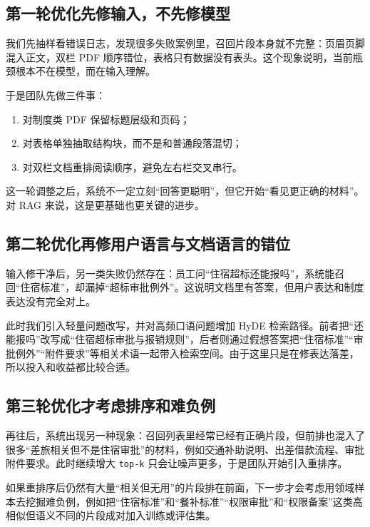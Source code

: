 \subsection{第一轮优化先修输入，不先修模型}
我们先抽样看错误日志，发现很多失败案例里，召回片段本身就不完整：页眉页脚混入正文，双栏 PDF 顺序错位，表格只有数据没有表头。这个现象说明，当前瓶颈根本不在模型，而在输入理解。

于是团队先做三件事：
\begin{enumerate}
  \item 对制度类 PDF 保留标题层级和页码；
  \item 对表格单独抽取结构块，而不是和普通段落混切；
  \item 对双栏文档重排阅读顺序，避免左右栏交叉串行。
\end{enumerate}

这一轮调整之后，系统不一定立刻“回答更聪明”，但它开始“看见更正确的材料”。对 RAG 来说，这是更基础也更关键的进步。

\subsection{第二轮优化再修用户语言与文档语言的错位}
输入修干净后，另一类失败仍然存在：员工问“住宿超标还能报吗”，系统能召回“住宿标准”，却漏掉“超标审批例外”。这说明文档里有答案，但用户表达和制度表达没有完全对上。

此时我们引入轻量问题改写，并对高频口语问题增加 HyDE 检索路径。前者把“还能报吗”改写成“住宿超标审批与报销规则”，后者则通过假想答案把“住宿标准”“审批例外”“附件要求”等相关术语一起带入检索空间。由于这里只是在修表达落差，所以投入和收益都比较合适。

\subsection{第三轮优化才考虑排序和难负例}
再往后，系统出现另一种现象：召回列表里经常已经有正确片段，但前排也混入了很多“差旅相关但不是住宿审批”的材料，例如交通补助说明、出差借款流程、审批附件要求。此时继续增大 \texttt{top-k} 只会让噪声更多，于是团队开始引入重排序。

如果重排序后仍然有大量“相关但无用”的片段排在前面，下一步才会考虑用领域样本去挖掘难负例，例如把“住宿标准”和“餐补标准”“权限审批”和“权限备案”这类高相似但语义不同的片段成对加入训练或评估集。

